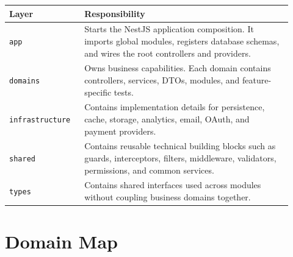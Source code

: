 \documentclass[11pt,a4paper]{article}
\begin{document}
\begin{center}
\begin{tabular}{p{0.24\linewidth} p{0.68\linewidth}}
\toprule
\textbf{Layer} & \textbf{Responsibility} \\
\midrule
\texttt{app} & Starts the NestJS application composition. It imports global modules, registers database schemas, and wires the root controllers and providers. \\
\texttt{domains} & Owns business capabilities. Each domain contains controllers, services, DTOs, modules, and feature-specific tests. \\
\texttt{infrastructure} & Contains implementation details for persistence, cache, storage, analytics, email, OAuth, and payment providers. \\
\texttt{shared} & Contains reusable technical building blocks such as guards, interceptors, filters, middleware, validators, permissions, and common services. \\
\texttt{types} & Contains shared interfaces used across modules without coupling business domains together. \\
\bottomrule
\end{tabular}
\end{center}

\section*{Domain Map}
\end{document}
